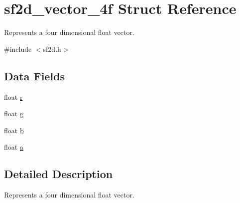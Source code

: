 \hypertarget{structsf2d__vector__4f}{\section{sf2d\-\_\-vector\-\_\-4f Struct Reference}
\label{structsf2d__vector__4f}
}


Represents a four dimensional float vector.  




{\ttfamily \#include $<$sf2d.\-h$>$}

\subsection*{Data Fields}
\begin{DoxyCompactItemize}
\item 
float \hyperlink{structsf2d__vector__4f_a9b6406bf98af7640a13a9027b64c7b04}{r}
\item 
float \hyperlink{structsf2d__vector__4f_a1c6ed8a78238cc48834cfdd3022efa3c}{g}
\item 
float \hyperlink{structsf2d__vector__4f_a086d3a04d19322849a3ffa1e01f18c41}{b}
\item 
float \hyperlink{structsf2d__vector__4f_aac68efbadd85967e74d917970f595823}{a}
\end{DoxyCompactItemize}


\subsection{Detailed Description}
Represents a four dimensional float vector. 

